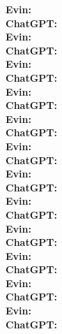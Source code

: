 \documentclass{article}[10pt]
\begin{document}
\noindent \textbf{Evin:}\\

\noindent \textbf{ChatGPT:}\\

\noindent \textbf{Evin:}\\

\noindent \textbf{ChatGPT:}\\

\noindent \textbf{Evin:}\\

\noindent \textbf{ChatGPT:}\\

\noindent \textbf{Evin:}\\

\noindent \textbf{ChatGPT:}\\

\noindent \textbf{Evin:}\\

\noindent \textbf{ChatGPT:}\\

\noindent \textbf{Evin:}\\

\noindent \textbf{ChatGPT:}\\

\noindent \textbf{Evin:}\\

\noindent \textbf{ChatGPT:}\\

\noindent \textbf{Evin:}\\

\noindent \textbf{ChatGPT:}\\

\noindent \textbf{Evin:}\\

\noindent \textbf{ChatGPT:}\\

\noindent \textbf{Evin:}\\

\noindent \textbf{ChatGPT:}\\

\noindent \textbf{Evin:}\\

\noindent \textbf{ChatGPT:}\\

\noindent \textbf{Evin:}\\

\noindent \textbf{ChatGPT:}\\
\end{document}
